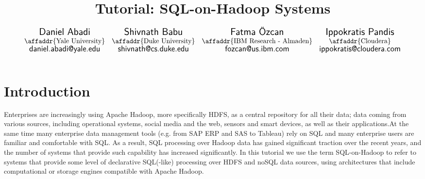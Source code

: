 \documentclass{vldb}
\begin{document}
\title{Tutorial: SQL-on-Hadoop Systems}


\author{
$
\begin{array}{cccc}
  \mbox{\Large \sf Daniel Abadi} &
  \mbox{\Large \sf Shivnath Babu} &
  \mbox{\Large \sf Fatma {\"O}zcan} &
  \mbox{\Large \sf Ippokratis Pandis}\\
  \mbox{\affaddr{Yale University}} &
  \mbox{\affaddr{Duke University}} &
  \mbox{\affaddr{IBM Research - Almaden}} &
  \mbox{\affaddr{Cloudera}}\\
  \mbox{{\large \sf daniel.abadi@yale.edu}} &
  \mbox{{\large \sf shivnath@cs.duke.edu}} &
  \mbox{{\large \sf fozcan@us.ibm.com}} &
  \mbox{{\large \sf ippokratis@cloudera.com}}
\end{array}
$
\\
}
\maketitle




\section{Introduction}
Enterprises are increasingly using Apache Hadoop, more specifically HDFS, as a central repository for all their data;
data coming from various sources, including operational systems, social media and the web, sensors and smart devices, as well as their applications.At the same time many enterprise data management tools (e.g. from SAP ERP and SAS to Tableau) rely on SQL and many enterprise users are familiar and comfortable with SQL.
As a result, SQL processing over Hadoop data has gained significant traction over the recent years, and the number of systems that provide such capability has increased significantly.
In this tutorial we use the term SQL-on-Hadoop to refer to systems that provide some level of declarative SQL(-like) processing over HDFS and noSQL data sources, using architectures that include computational or storage engines compatible with Apache Hadoop. 
\end{document}
